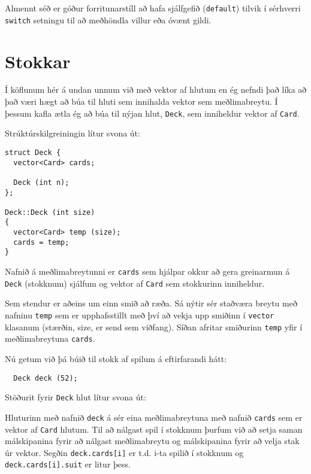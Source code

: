 
Almennt séð er góður forritunarstíll að hafa sjálfgefið ({\tt default}) tilvik í sérhverri     
{\tt switch} setningu til að meðhöndla villur eða óvænt gildi. 

\section{Stokkar}
\label{deck}

Í köflunum hér á undan unnum við með vektor af hlutum 
en ég nefndi það líka að það væri hægt að búa til hluti 
sem innihalda vektor sem meðlimabreytu.
Í þessum kafla ætla ég að búa til nýjan hlut, {\tt Deck},
sem inniheldur vektor af {\tt Card}.


Strúktúrskilgreiningin lítur svona út:

\begin{verbatim}
struct Deck {
  vector<Card> cards;

  Deck (int n);
};

Deck::Deck (int size)
{
  vector<Card> temp (size);
  cards = temp;
}
\end{verbatim}
%
Nafnið á meðlimabreytunni er {\tt cards} sem hjálpar okkur að gera
greinarmun á {\tt Deck} (stokknum) sjálfum og vektor af {\tt Card} sem stokkurinn inniheldur.



Sem stendur er aðeins um einn smið að ræða.
Sá nýtir sér staðværa breytu með nafninu {\tt temp} sem er upphafsstillt
með því að vekja upp smiðinn í {\tt vector} klasanum (stærðin, size, er send sem viðfang).
Síðan afritar smiðurinn {\tt temp} yfir í meðlimabreytuna {\tt cards}.

Nú getum við þá búið til stokk af spilum á eftirfarandi hátt: 

\begin{verbatim}
  Deck deck (52);
\end{verbatim}
%
Stöðurit fyrir {\tt Deck} hlut lítur svona út:


\vspace {0.1in}
\centerline{}
\vspace {0.1in}

Hluturinn með nafnið {\tt deck} á sér eina meðlimabreytuna með nafnið {\tt cards}
sem er vektor af {\tt Card} hlutum.
Til að nálgast spil í stokknum þurfum við að setja saman málskipanina fyrir að nálgast meðlimabreytu
og málskipanina fyrir að velja stak úr vektor.
Segðin {\tt deck.cards[i]} er t.d. i-ta spilið í stokknum og
{\tt deck.cards[i].suit} er litur þess.

